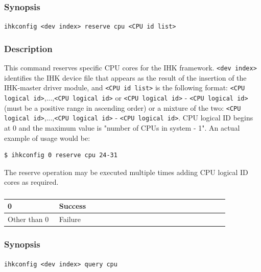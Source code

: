 \documentclass[twoside,11pt,fleqn]{book}
\begin{document}
\subsubsection{}\label{sec:reserve_cpu}
\subsubsection*{Synopsis}{\quad} \texttt{ihkconfig <dev index> reserve cpu <CPU id list>}
\subsubsection*{Description}{\quad}
This command reserves specific CPU cores for the IHK framework.
\texttt{<dev index>} identifies
the IHK device file that appears as the result of the insertion of the
IHK-master driver module, and \texttt{<CPU id list>} is the following format:
\texttt{<CPU logical id>},...,\texttt{<CPU logical id>} or
\texttt{<CPU logical id>} - \texttt{<CPU logical id>}
(must be a positive range in ascending order)
or a mixture of the two: \texttt{<CPU logical id>},...,\texttt{<CPU logical
id>} - \texttt{<CPU logical id>}.
CPU logical ID begins at 0 and the maximum value is "number of CPUs in system - 1".
An actual example of usage would be:

\begin{verbatim}
$ ihkconfig 0 reserve cpu 24-31
\end{verbatim}

The reserve operation may be executed multiple times adding
CPU logical ID cores as required.

\subsubsection*{}
\begin{table}[!h]
\footnotesize
\begin{tabular}{|p{0.20\linewidth}|p{0.66\linewidth}|} \hline
0&Success\\ \hline
Other than 0&Failure\\ \hline
\end{tabular}
\vspace{-0em}
\end{table}
\FloatBarrier

\subsubsection{}
\subsubsection*{Synopsis}{\quad} \texttt{ihkconfig <dev index> query cpu}
\end{document}
